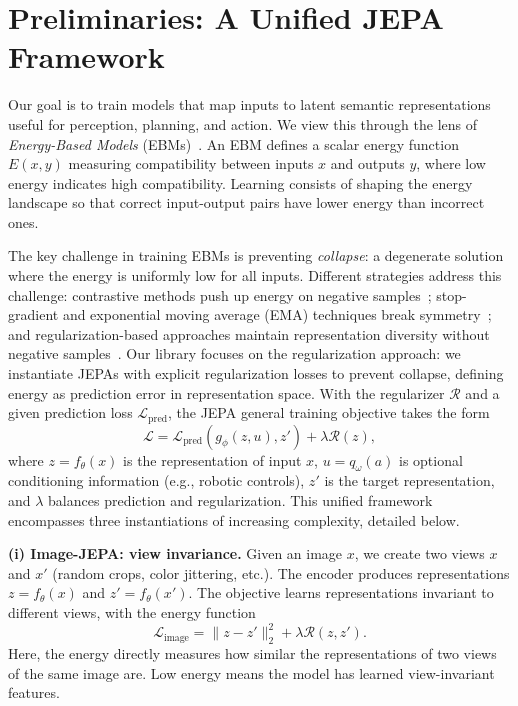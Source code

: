 \documentclass{article}
\begin{document}
\section{Preliminaries: A Unified JEPA Framework}

Our goal is to train models that map inputs to latent semantic representations useful for perception, planning, and action.
We view this through the lens of \emph{Energy-Based Models} (EBMs)~\citep{LeCunEBMTutorial2006,Hopfield1982}. An EBM defines a scalar energy function $E(x, y)$ measuring compatibility between inputs $x$ and outputs $y$, where low energy indicates high compatibility.
Learning consists of shaping the energy landscape so that correct input-output pairs have lower energy than incorrect ones.

The key challenge in training EBMs is preventing \textit{collapse}: a degenerate solution where the energy is uniformly low for all inputs.
Different strategies address this challenge: contrastive methods push up energy on negative samples~\citep{ContrastiveDivergence2002,SimCLR,MoCo}; stop-gradient and exponential moving average (EMA) techniques break symmetry~\citep{BYOL,SimSiam,IJEPA,VJEPA}; and regularization-based approaches maintain representation diversity without negative samples~\citep{VICReg,BarlowTwins,balestriero2025lejepaprovablescalableselfsupervised}.
Our library focuses on the regularization approach: we instantiate JEPAs with explicit regularization losses to prevent collapse, defining energy as prediction error in representation space.
With the regularizer $\mathcal{R}$ and a given prediction loss $\mathcal{L}_{\text{pred}}$, the JEPA general training objective takes the form
\begin{equation}
\mathcal{L} = \mathcal{L}_{\text{pred}}(g_\phi(z, u), z') + \lambda \mathcal{R}(z),
\label{eq:general_jepa}
\end{equation}
where $z = f_\theta(x)$ is the representation of input $x$, $u=q_\omega(a)$ is optional conditioning information (e.g., robotic controls), $z'$ is the target representation, and $\lambda$ balances prediction and regularization.
This unified framework encompasses three instantiations of increasing complexity, detailed below.

\textbf{(i) Image-JEPA: view invariance.}
Given an image $x$, we create two views $x$ and $x'$ (random crops, color jittering, etc.).
The encoder produces representations $z = f_\theta(x)$ and $z' = f_\theta(x')$.
The objective learns representations invariant to different views, with the energy function
\begin{equation}
\mathcal{L}_{\text{image}} = \|z - z'\|_2^2 + \lambda \mathcal{R}(z, z').
\label{eq:image_jepa_energy}
\end{equation}
Here, the energy directly measures how similar the representations of two views of the same image are. Low energy means the model has learned view-invariant features.
\end{document}
